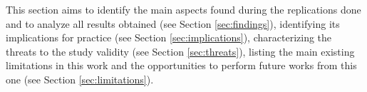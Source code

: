 This section aims to identify the main aspects found during the replications done and to analyze all results obtained (see Section \ref{sec:findings}), identifying its implications for practice (see Section \ref{sec:implications}), characterizing the threats to the study validity (see Section \ref{sec:threats}), listing the main existing limitations in this work and the opportunities to perform future works from this one (see Section \ref{sec:limitations}).